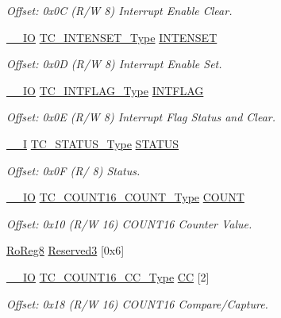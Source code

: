 \begin{DoxyCompactItemize}
\begin{DoxyCompactList}\small\item\em Offset\+: 0x0C (R/W 8) Interrupt Enable Clear. \end{DoxyCompactList}\item 
\mbox{\hyperlink{core__cm0plus_8h_aec43007d9998a0a0e01faede4133d6be}{\+\_\+\+\_\+\+IO}} \mbox{\hyperlink{union_t_c___i_n_t_e_n_s_e_t___type}{T\+C\+\_\+\+I\+N\+T\+E\+N\+S\+E\+T\+\_\+\+Type}} \mbox{\hyperlink{struct_tc_count16_a59e384762759e5950e3d32d1f3b358d6}{I\+N\+T\+E\+N\+S\+ET}}
\begin{DoxyCompactList}\small\item\em Offset\+: 0x0D (R/W 8) Interrupt Enable Set. \end{DoxyCompactList}\item 
\mbox{\hyperlink{core__cm0plus_8h_aec43007d9998a0a0e01faede4133d6be}{\+\_\+\+\_\+\+IO}} \mbox{\hyperlink{union_t_c___i_n_t_f_l_a_g___type}{T\+C\+\_\+\+I\+N\+T\+F\+L\+A\+G\+\_\+\+Type}} \mbox{\hyperlink{struct_tc_count16_a076bcac2737bf4d77b94d8ca8362a8f0}{I\+N\+T\+F\+L\+AG}}
\begin{DoxyCompactList}\small\item\em Offset\+: 0x0E (R/W 8) Interrupt Flag Status and Clear. \end{DoxyCompactList}\item 
\mbox{\hyperlink{core__cm0plus_8h_af63697ed9952cc71e1225efe205f6cd3}{\+\_\+\+\_\+I}} \mbox{\hyperlink{union_t_c___s_t_a_t_u_s___type}{T\+C\+\_\+\+S\+T\+A\+T\+U\+S\+\_\+\+Type}} \mbox{\hyperlink{struct_tc_count16_af7f33b0963c8311ce45fe0f929a1a9c5}{S\+T\+A\+T\+US}}
\begin{DoxyCompactList}\small\item\em Offset\+: 0x0F (R/ 8) Status. \end{DoxyCompactList}\item 
\mbox{\hyperlink{core__cm0plus_8h_aec43007d9998a0a0e01faede4133d6be}{\+\_\+\+\_\+\+IO}} \mbox{\hyperlink{union_t_c___c_o_u_n_t16___c_o_u_n_t___type}{T\+C\+\_\+\+C\+O\+U\+N\+T16\+\_\+\+C\+O\+U\+N\+T\+\_\+\+Type}} \mbox{\hyperlink{struct_tc_count16_aaec7f831601ba8c34e6e77e8b7503300}{C\+O\+U\+NT}}
\begin{DoxyCompactList}\small\item\em Offset\+: 0x10 (R/W 16) C\+O\+U\+N\+T16 Counter Value. \end{DoxyCompactList}\item 
\mbox{\hyperlink{group___s_a_m_d21_e15_a__definitions_ga0d957f1433aaf5d70e4dc2b68288442d}{Ro\+Reg8}} \mbox{\hyperlink{struct_tc_count16_a068f74ca484a01ac64b9e382439e5fc7}{Reserved3}} \mbox{[}0x6\mbox{]}
\item 
\mbox{\hyperlink{core__cm0plus_8h_aec43007d9998a0a0e01faede4133d6be}{\+\_\+\+\_\+\+IO}} \mbox{\hyperlink{union_t_c___c_o_u_n_t16___c_c___type}{T\+C\+\_\+\+C\+O\+U\+N\+T16\+\_\+\+C\+C\+\_\+\+Type}} \mbox{\hyperlink{struct_tc_count16_abc511320182a4cd1411b852c5ea54c56}{CC}} \mbox{[}2\mbox{]}
\begin{DoxyCompactList}\small\item\em Offset\+: 0x18 (R/W 16) C\+O\+U\+N\+T16 Compare/\+Capture. \end{DoxyCompactList}\end{DoxyCompactItemize}


